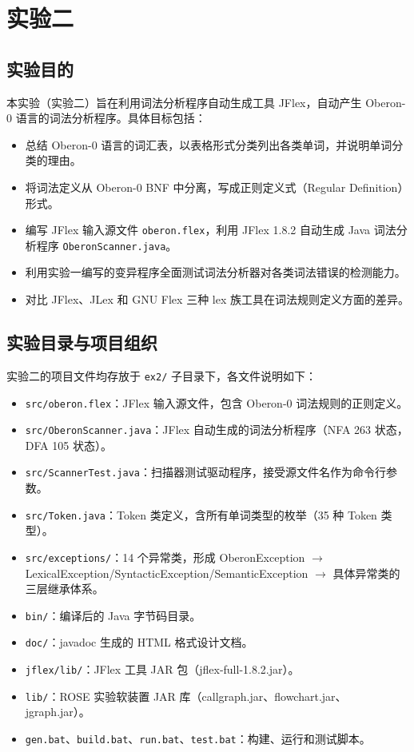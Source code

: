 \chapter{实验二}

\section*{实验目的}

本实验（实验二）旨在利用词法分析程序自动生成工具 JFlex，自动产生 Oberon-0 语言的词法分析程序。具体目标包括：

\begin{itemize}
    \item 总结 Oberon-0 语言的词汇表，以表格形式分类列出各类单词，并说明单词分类的理由。
    \item 将词法定义从 Oberon-0 BNF 中分离，写成正则定义式（Regular Definition）形式。
    \item 编写 JFlex 输入源文件 \texttt{oberon.flex}，利用 JFlex 1.8.2 自动生成 Java 词法分析程序 \texttt{OberonScanner.java}。
    \item 利用实验一编写的变异程序全面测试词法分析器对各类词法错误的检测能力。
    \item 对比 JFlex、JLex 和 GNU Flex 三种 lex 族工具在词法规则定义方面的差异。
\end{itemize}

\section*{实验目录与项目组织}

实验二的项目文件均存放于 \texttt{ex2/} 子目录下，各文件说明如下：

\begin{itemize}
    \item \texttt{src/oberon.flex}：JFlex 输入源文件，包含 Oberon-0 词法规则的正则定义。
    \item \texttt{src/OberonScanner.java}：JFlex 自动生成的词法分析程序（NFA 263 状态，DFA 105 状态）。
    \item \texttt{src/ScannerTest.java}：扫描器测试驱动程序，接受源文件名作为命令行参数。
    \item \texttt{src/Token.java}：Token 类定义，含所有单词类型的枚举（35 种 Token 类型）。
    \item \texttt{src/exceptions/}：14 个异常类，形成 OberonException $\to$ LexicalException/SyntacticException/SemanticException $\to$ 具体异常类的三层继承体系。
    \item \texttt{bin/}：编译后的 Java 字节码目录。
    \item \texttt{doc/}：javadoc 生成的 HTML 格式设计文档。
    \item \texttt{jflex/lib/}：JFlex 工具 JAR 包（jflex-full-1.8.2.jar）。
    \item \texttt{lib/}：ROSE 实验软装置 JAR 库（callgraph.jar、flowchart.jar、jgraph.jar）。
    \item \texttt{gen.bat}、\texttt{build.bat}、\texttt{run.bat}、\texttt{test.bat}：构建、运行和测试脚本。
\end{itemize}

